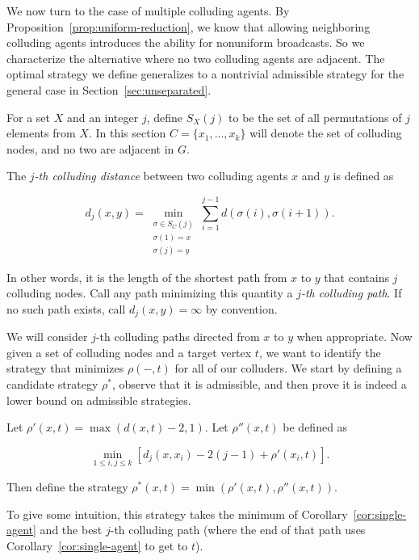 \documentclass{comnet}
\begin{document}
We now turn to the case of multiple colluding agents. By
Proposition~\ref{prop:uniform-reduction}, we know that allowing neighboring
colluding agents introduces the ability for nonuniform broadcasts. So we
characterize the alternative where no two colluding agents are adjacent. The
optimal strategy we define generalizes to a nontrivial admissible strategy for
the general case in Section~\ref{sec:unseparated}.

For a set $X$ and an integer $j$, define $S_X(j)$ to be the set of all
permutations of $j$ elements from $X$. In this section $C = \{ x_1, \dots, x_k
\}$ will denote the set of colluding nodes, and no two are adjacent in $G$.

\begin{definition}
The \emph{$j$-th colluding distance} between two colluding agents $x$ and $y$
is defined as

\[
   d_j(x, y)= \min_{\substack{\sigma \in S_C(j) \\ \sigma(1) = x \\ \sigma(j) =
y}}
         \sum_{i=1}^{j-1} d(\sigma(i),\sigma(i+1)).
\]

In other words, it is the length of the shortest path from $x$ to $y$ that
contains $j$ colluding nodes. Call any path minimizing this quantity a
\emph{$j$-th colluding path}. If no such path exists, call $d_j(x,y) = \infty$
by convention.  \end{definition}

We will consider $j$-th colluding paths directed from $x$ to $y$ when
appropriate. Now given a set of colluding nodes and a target vertex $t$, we
want to identify the strategy that minimizes $\rho(-,t)$ for all of our
colluders. We start by defining a candidate strategy $\rho^*$, observe that it
is admissible, and then prove it is indeed a lower bound on admissible
strategies.

\begin{definition} \label{def:colluding-distance}
Let $\rho'(x,t) = \max(d(x,t) - 2, 1)$. Let $\rho''(x, t)$ be defined as

\[
   \min_{1 \leq i,j \leq k} \left [ d_j(x,x_i)-2(j-1) + \rho'(x_i, t) \right ].
\]

Then define the strategy $\rho^*(x,t)=\min(\rho'(x,t), \rho''(x, t))$.

\end{definition}

To give some intuition, this strategy takes the minimum of
Corollary~\ref{cor:single-agent} and the best $j$-th colluding path (where the
end of that path uses Corollary~\ref{cor:single-agent} to get to $t$).
\end{document}
